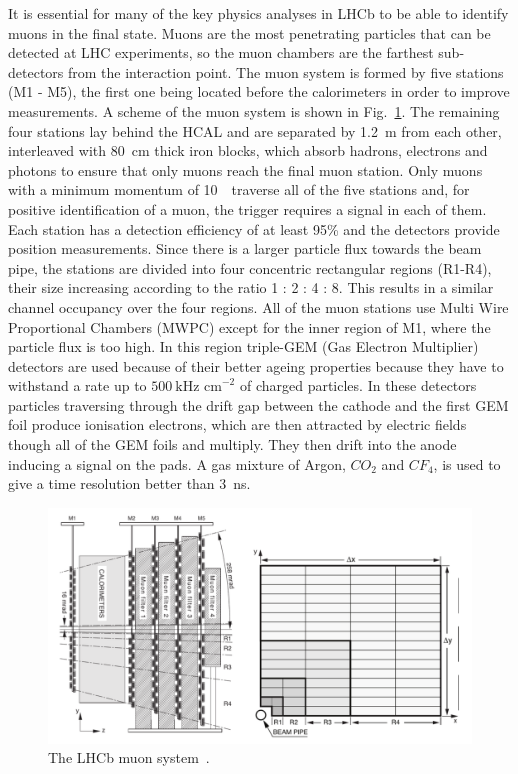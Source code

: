 It is essential for many of the key physics analyses in LHCb to be able to identify muons in the final state.
Muons are the most penetrating particles that can be detected at LHC experiments, so the muon chambers
are the farthest sub-detectors from the interaction point. The muon system is formed by five stations (M1 - M5),
the first one being located before the calorimeters in order to improve \pt measurements. A scheme of the muon
system is shown in Fig.~\ref{fig:muonsystem}. The remaining four stations lay behind the HCAL
and are separated by 1.2~m
from each other, interleaved with 80~cm thick iron blocks, which absorb hadrons, electrons and photons to ensure
that only muons reach the final muon station. Only muons with a minimum momentum of 10~\gevc~traverse all of the
five stations and, for positive identification of a muon, the trigger requires a signal in each of them.
Each station has a detection efficiency of at least 95\% and the detectors provide position measurements.
Since there is a larger particle flux towards the beam pipe, the stations are divided
into four concentric rectangular regions (R1-R4), their size increasing according to the ratio 1 : 2 : 4 : 8.
This results in a similar channel occupancy over the four regions. All of the muon stations use
Multi Wire Proportional Chambers (MWPC) except for the inner region of M1, where the particle flux is too high.
In this region triple-GEM (Gas Electron Multiplier) detectors are used because of their better ageing properties
because they have to withstand a rate up to
$500 ~\mbox{kHz cm}^{-2}$ of charged particles. In these detectors particles traversing through the drift gap
between the cathode and the first GEM foil produce ionisation electrons, which are then attracted by electric fields
though all of the GEM foils and multiply. They then drift into the anode inducing a signal on the pads. A gas mixture
of Argon, $CO_2$ and $CF_4$, is used to give a time resolution better than 3~ns.
%
\begin{figure}[h!]
\centering \includegraphics[width=1.0\textwidth]{Detector/figs/muon.png}
\caption{The LHCb muon system~\cite{Alves:2008zz}.}
\label{fig:muonsystem}
\end{figure}

